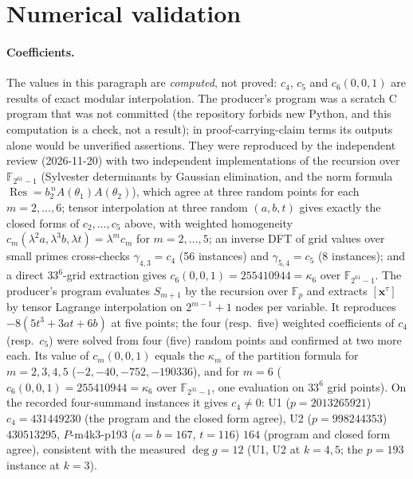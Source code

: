\documentclass[11pt]{article}
\newcommand{\F}{\mathbb F}
\newcommand{\Res}{\operatorname{Res}}
\theoremstyle{definition}
\theoremstyle{remark}
\begin{document}
\section{Numerical validation}\label{sec:numerics}
\paragraph{Coefficients.} The values in this paragraph are
\emph{computed}, not proved: $c_4$, $c_5$ and $c_6(0,0,1)$ are results of
exact modular interpolation. The producer's program was a scratch C program
that was not committed (the repository forbids new Python, and this computation is a
check, not a result); in proof-carrying-claim terms its outputs alone would be
unverified assertions. They were reproduced by the independent review
(2026-11-20) with two independent implementations of the recursion over
$\F_{2^{61}-1}$ (Sylvester determinants by Gaussian elimination, and the
norm formula $\Res=b_2^{\,n}A(\theta_1)A(\theta_2)$), which agree at three random
points for each $m=2,\ldots,6$; tensor interpolation at three random
$(a,b,t)$ gives exactly the closed forms of $c_2,\ldots,c_5$ above, with
weighted homogeneity $c_m(\lambda^2a,\lambda^3b,\lambda t)=\lambda^mc_m$ for
$m=2,\ldots,5$; an inverse DFT of grid values over small primes cross-checks
$\gamma_{4,3}=c_4$ (56 instances) and $\gamma_{5,4}=c_5$ (8 instances); and a
direct $33^6$-grid extraction gives $c_6(0,0,1)=255410944=\kappa_6$ over
$\F_{2^{61}-1}$. The producer's program evaluates $S_{m+1}$ by the recursion over $\F_p$ and extracts
$[\mathbf x^\tau]$ by tensor Lagrange interpolation on $2^{m-1}+1$ nodes per
variable. It reproduces $-8(5t^3+3at+6b)$ at five points; the four
(resp.\ five) weighted coefficients of $c_4$ (resp.\ $c_5$) were solved from
four (five) random points and confirmed at two more each. Its value of $c_m(0,0,1)$ equals the
$\kappa_m$ of the partition formula for $m=2,3,4,5$ ($-2,-40,-752,-190336$), and for $m=6$ ($c_6(0,0,1)=255410944=\kappa_6$ over $\F_{2^{31}-1}$, one evaluation on $33^6$ grid points).
On the recorded
four-summand instances it gives $c_4\ne0$: U1 ($p=2013265921$) $c_4=431449230$
(the program and the closed form agree), U2 ($p=998244353$) $430513295$,
$P$-m4k3-p193 ($a=b=167$, $t=116$) $164$ (program and closed form agree), consistent
with the measured $\deg g=12$ (U1, U2 at $k=4,5$; the $p=193$ instance at $k=3$).
\end{document}
